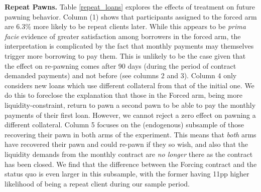\documentclass[11pt, a4paper]{article}
\begin{document}
\vspace{.2in}
\noindent \textbf{Repeat Pawns.}
Table \ref{repeat_loans} explores the effects of treatment on future pawning behavior.
Column (1) shows that participants assigned to the forced arm are 6.3\% more likely to be repeat clients later. %
While this appears to be \emph{prima facie} evidence of greater satisfaction among borrowers in the forced arm, the interpretation is complicated by the fact that monthly payments may themselves trigger more borrowing to pay them. This is unlikely to be the case given that the effect on re-pawning comes after 90 days (during the period of contract demanded payments) and not before  (see columns 2 and 3). Column 4 only considers new loans which use different collateral from that of the initial one. We do this to foreclose the explanation that those in the Forced arm, being more liquidity-constraint, return to pawn a second pawn to be able to pay the monthly payments of their first loan. However, we cannot reject a zero effect on pawning a different collateral. Column 5 focuses on the (endogenous) subsample of those recovering their pawn in both arms of the experiment. This means that \textit{both} arms have recovered their pawn and could re-pawn if they so wish, and also that the liquidity demands from the monthly contract are \textit{no longer} there as the contract has been closed.  We find that the difference between the Forcing contract and the status quo is even larger in this subsample, with the former having 11pp higher likelihood of being a repeat client during our sample period.
\end{document}

